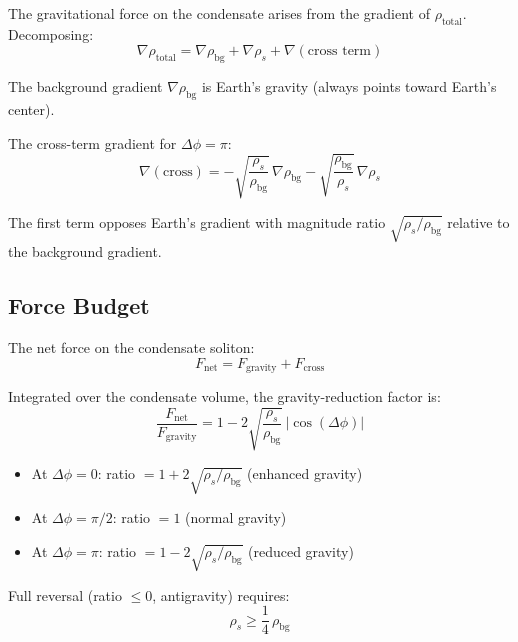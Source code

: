 \documentclass[11pt, a4paper]{article}
\begin{document}
The gravitational force on the condensate arises from the
gradient of $\rho_{\text{total}}$. Decomposing:
\begin{equation}
  \nabla\rho_{\text{total}} = \nabla\rho_{\text{bg}}
  + \nabla\rho_s + \nabla(\text{cross term})
\end{equation}

The background gradient $\nabla\rho_{\text{bg}}$ is Earth's
gravity (always points toward Earth's center).

The cross-term gradient for $\Delta\phi = \pi$:
\begin{equation}
  \nabla(\text{cross}) =
  -\sqrt{\frac{\rho_s}{\rho_{\text{bg}}}}\,\nabla\rho_{\text{bg}}
  - \sqrt{\frac{\rho_{\text{bg}}}{\rho_s}}\,\nabla\rho_s
\end{equation}

The first term opposes Earth's gradient with magnitude ratio
$\sqrt{\rho_s/\rho_{\text{bg}}}$ relative to the background
gradient.

\subsection{Force Budget}

The net force on the condensate soliton:
\begin{equation}
  F_{\text{net}} = F_{\text{gravity}} + F_{\text{cross}}
\end{equation}

Integrated over the condensate volume, the gravity-reduction
factor is:
\begin{equation}
  \frac{F_{\text{net}}}{F_{\text{gravity}}} =
  1 - 2\sqrt{\frac{\rho_s}{\rho_{\text{bg}}}}\,
  |\cos(\Delta\phi)|
  \label{eq:reduction}
\end{equation}

\begin{itemize}[nosep]
  \item At $\Delta\phi = 0$: ratio $= 1 + 2\sqrt{\rho_s/\rho_{\text{bg}}}$ (enhanced gravity)
  \item At $\Delta\phi = \pi/2$: ratio $= 1$ (normal gravity)
  \item At $\Delta\phi = \pi$: ratio $= 1 - 2\sqrt{\rho_s/\rho_{\text{bg}}}$ (reduced gravity)
\end{itemize}

Full reversal (ratio $\leq 0$, antigravity) requires:
\begin{equation}
  \rho_s \geq \frac{1}{4}\,\rho_{\text{bg}}
\end{equation}
\end{document}

